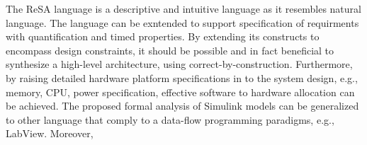 The ReSA language is a descriptive and intuitive language as it resembles natural language. The language can be exntended to support specification of requirments with quantification and timed properties. By extending its constructs to encompass design constraints, it should be possible and in fact beneficial to synthesize a high-level architecture, using correct-by-construction. Furthermore, by raising detailed hardware platform specifications in to the system design, e.g., memory, CPU, power specification, effective software to hardware allocation can be achieved. The proposed formal analysis of Simulink models can be generalized to other language that comply to a data-flow programming paradigms, e.g., LabView. Moreover, 
